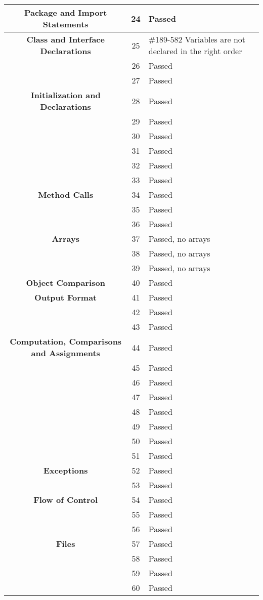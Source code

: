 \documentclass[11pt, a4paper,titlepage]{article}
\begin{document}
\newpage
\begin{tabularx}{\textwidth}{| c |c |X |}
	\hline \textbf{Package and Import Statements} & 24 & Passed \\
	\hline \textbf{Class and Interface Declarations} & 25 & \#189-582 Variables are not declared in the right order \\
	\hline  & 26 & Passed \\
	\hline  & 27 & Passed \\
	\hline \textbf{Initialization and Declarations} & 28 & Passed \\
	\hline  & 29 & Passed \\
	\hline  & 30 & Passed \\
	\hline  & 31 & Passed \\
	\hline  & 32 & Passed \\
	\hline  & 33 & Passed \\
	\hline \textbf{Method Calls} & 34 & Passed \\
	\hline  & 35 & Passed \\
	\hline  & 36 & Passed \\
	\hline \textbf{Arrays} & 37 & Passed, no arrays \\
	\hline  & 38 & Passed, no arrays \\
	\hline  & 39 & Passed, no arrays \\
	\hline \textbf{Object Comparison} & 40 & Passed \\
	\hline \textbf{Output Format} & 41 & Passed \\
	\hline  & 42 & Passed \\
	\hline  & 43 & Passed \\
	\hline \textbf{Computation, Comparisons and Assignments} & 44 & Passed \\
	\hline  & 45 & Passed \\
	\hline  & 46 & Passed \\
	\hline  & 47 & Passed \\
	\hline  & 48 & Passed \\
	\hline  & 49 & Passed \\
	\hline  & 50 & Passed \\
	\hline  & 51 & Passed \\
	\hline \textbf{Exceptions} & 52 & Passed \\
	\hline  & 53 & Passed \\
	\hline \textbf{Flow of Control} & 54 & Passed \\
	\hline  & 55 & Passed \\
	\hline  & 56 & Passed \\
	\hline \textbf{Files} & 57 & Passed \\
	\hline  & 58 & Passed \\
	\hline  & 59 & Passed \\
	\hline  & 60 & Passed \\
	\hline
\end{tabularx}
\end{document}

